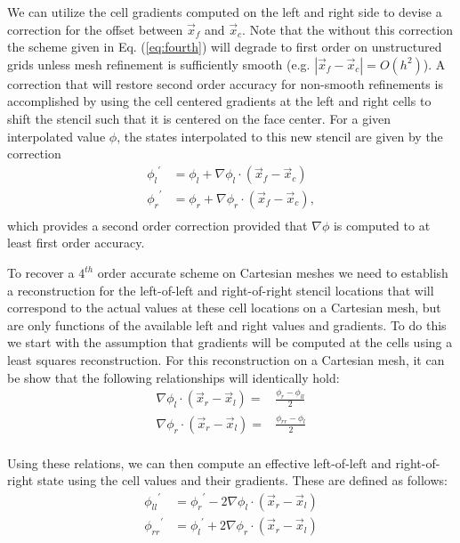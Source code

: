 We can utilize the cell gradients computed on the left and right side
to devise a correction for the offset between $\vec{x}_f$ and
$\vec{x}_c$.  Note that the without this correction the scheme given
in Eq. (\ref{eq:fourth}) will degrade to first order on unstructured
grids unless mesh refinement is sufficiently smooth
(e.g. $|\vec{x}_f-\vec{x}_c| = O(h^2)$). A correction that will
restore second order accuracy for non-smooth refinements is
accomplished by using the cell centered gradients at the left and
right cells to shift the stencil such that it is centered on the face
center.  For a given interpolated value $\phi$, the states
interpolated to this new stencil are given by the correction
\begin{equation}
\begin{aligned}
{\phi_{l}}^{'} &= \phi_l + \nabla \phi_l \cdot (\vec{x}_f-\vec{x}_c)\\
{\phi_{r}}^{'} &= \phi_r + \nabla \phi_r \cdot (\vec{x}_f-\vec{x}_c),\\
\end{aligned}
\end{equation}
which provides a second order correction provided that $\nabla \phi$
is computed to at least first order accuracy.

To recover a $4^{th}$ order accurate scheme on Cartesian meshes we
need to establish a reconstruction for the left-of-left and
right-of-right stencil locations that will correspond to the actual
values at these cell locations on a Cartesian mesh, but are only
functions of the available left and right values and gradients.  To do
this we start with the assumption that gradients will be computed at
the cells using a least squares reconstruction.  For this
reconstruction on a Cartesian mesh, it can be show that the following
relationships will identically hold:
\begin{equation}
\begin{aligned}
\nabla \phi_l \cdot (\vec{x}_r-\vec{x}_l) = &\frac{\phi_{r}-\phi_{ll}}{2}\\
\nabla \phi_r \cdot (\vec{x}_r-\vec{x}_l) = &\frac{\phi_{rr}-\phi_{l}}{2}\\
\end{aligned}
\end{equation}

Using these relations, we can then compute an effective left-of-left
and right-of-right state using the cell values and their gradients.
These are defined as follows:
\begin{equation}
\begin{aligned}
{\phi_{ll}}^{'} &= {\phi_r}^{'} - 2 \nabla \phi_l \cdot (\vec{x}_r-\vec{x}_l) \\
{\phi_{rr}}^{'} &= {\phi_l}^{'} + 2 \nabla \phi_r \cdot (\vec{x}_r-\vec{x}_l) \\
\end{aligned}
\end{equation}

